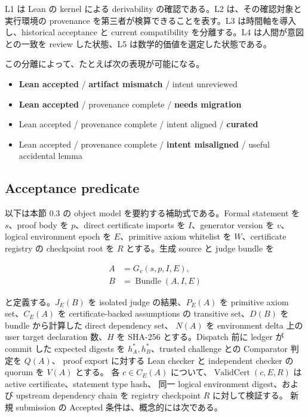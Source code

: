 \documentclass[a4paper,11pt]{ltjsarticle}
\newcommand{\status}[2]{\textcolor{#1}{\textbf{#2}}}
\begin{document}
L1 は Lean の kernel による derivability の確認である。L2 は、その確認対象と実行環境の provenance
を第三者が検算できることを表す。L3 は時間軸を導入し、historical acceptance と current compatibility
を分離する。L4 は人間が意図との一致を review した状態、L5 は数学的価値を選定した状態である。

この分離によって、たとえば次の表現が可能になる。

\begin{itemize}
  \item \status{TFGreen}{Lean accepted} / \status{TFRed}{artifact mismatch} / intent unreviewed
  \item \status{TFGreen}{Lean accepted} / provenance complete / \status{TFGold}{needs migration}
  \item Lean accepted / provenance complete / intent aligned / \status{TFNavy}{curated}
  \item Lean accepted / provenance complete / \status{TFRed}{intent misaligned} / useful accidental lemma
\end{itemize}

\subsection{Acceptance predicate}

以下は本節 0.3 の object model を要約する補助式である。Formal statement を $s$、proof body を $p$、direct certificate imports を $I$、generator version を $v$、
logical environment epoch を $E$、primitive axiom whitelist を $W$、certificate registry の
checkpoint root を $R$ とする。生成 source と judge bundle を

\begin{align}
  A &= G_v(s,p,I,E),\\
  B &= \operatorname{Bundle}(A,I,E)
\end{align}

と定義する。$J_E(B)$ を isolated judge の結果、$P_E(A)$ を primitive axiom set、$C_E(A)$ を
certificate-backed assumptions の transitive set、$D(B)$ を bundle から計算した direct dependency set、
$N(A)$ を environment delta 上の user target declaration 数、$H$ を SHA-256 とする。Dispatch 前に ledger が
commit した expected digests を $h_A^\ast,h_B^\ast$、trusted challenge との Comparator 判定を $Q(A)$、
proof export に対する Lean checker と independent checker の quorum を $V(A)$ とする。
各 $c\in C_E(A)$ について、\(\operatorname{ValidCert}(c,E,R)\) は active certificate、statement type hash、
同一 logical environment digest、および upstream dependency chain を registry checkpoint $R$ に対して検証する。
新規 submission の Accepted 条件は、概念的には次である。
\end{document}
